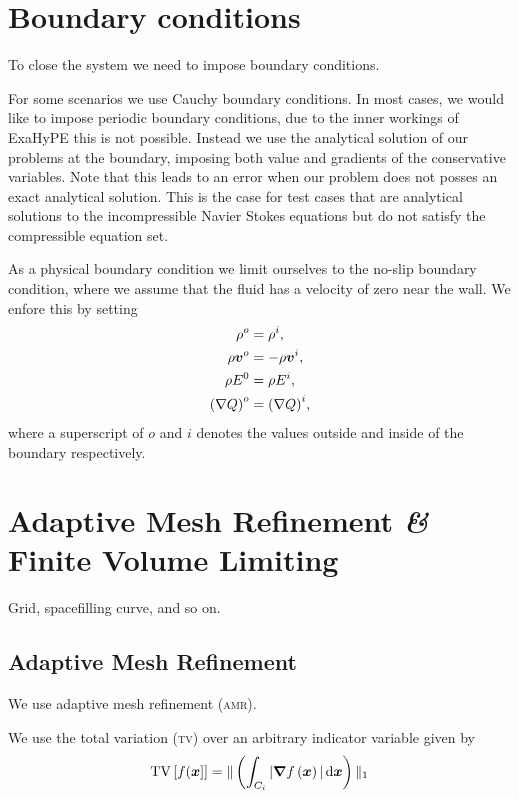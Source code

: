 \section{Boundary conditions}
To close the system we need to impose boundary conditions.

For some scenarios we use Cauchy boundary conditions.
In most cases, we would like to impose periodic boundary conditions, due to the inner workings of ExaHyPE this is not possible.
Instead we use the analytical solution of our problems at the boundary, imposing both value and gradients of the conservative variables.
Note that this leads to an error when our problem does not posses an exact analytical solution.
This is the case for test cases that are analytical solutions to the incompressible Navier Stokes equations but do not satisfy the compressible equation set.

As a physical boundary condition we limit ourselves to the no-slip boundary condition, where we assume that the fluid has a velocity of zero near the wall.
We enfore this by setting
\begin{align}
  \label{eq:no-slip}
  \begin{split}
  \rho^o &= \rho^i, \\
  \rho \bm{v}^o &= -\rho \bm{v}^i, \\
  \rho E^0 &= \rho E^i,\\
  {(\nabla Q)}^o &= {(\nabla Q)}^i,
  \end{split}
\end{align}
where a superscript of $o$ and $i$ denotes the values outside and inside of the boundary respectively.

\section{Adaptive Mesh Refinement \textit{\&} Finite Volume Limiting}\label{sec:grid}
Grid, spacefilling curve, and so on.

\subsection{Adaptive Mesh Refinement}\label{sec:amr}
We use adaptive mesh refinement (\textsc{amr}).

We use the total variation (\textsc{tv}) over an arbitrary indicator variable given by
\begin{equation}
  \label{eq:tv}
  \operatorname{TV}\left[ f(\bm{x}] \right] =
\Vert \left(\intdcell{ \vert \gradient{f \left( \bm{x} \right)} \vert } \right) \Vert_1
\end{equation}

